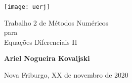 \begin{titlepage}
    \begin{center}
        \vspace*{1cm}

        \texttt{[image: uerj]}

        {\Huge
           Trabalho 2 de Métodos Numéricos \\
           para \\
           Equações Diferenciais II \par
        }

        \vspace{1.5cm}

        \textbf{Ariel Nogueira Kovaljski}

        \vspace{0.5cm}

        Nova Friburgo, XX de novembro de 2020
        \vfill

    \end{center}
\end{titlepage}